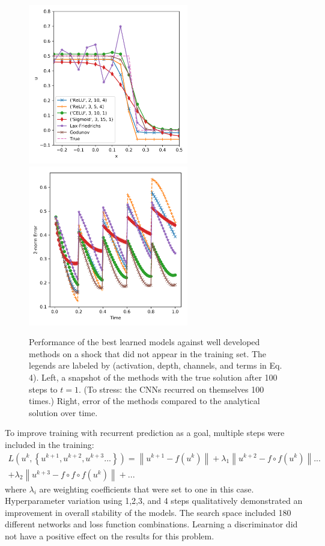 \documentclass{article}
\begin{document}
\begin{figure}
  \centering
  \includegraphics[width=2.75in]{shockwave_profile.png}%
  \includegraphics[width=2.75in]{shockwave_error.png}
  \caption{\label{fig:shock_comparison}Performance of the best learned models against well
    developed methods on a shock that did not appear in the
    training set. The legends are labeled by (activation, depth,
    channels, and terms in Eq. 4). Left, a snapshot of the methods with the true
    solution after 100 steps to $t=1$. (To stress: the CNNs recurred on
    themselves 100 times.) Right, error of the
    methods compared to the analytical solution over time. }
\end{figure}

To improve training with recurrent prediction as a goal,
multiple steps were included in the training:
\begin{eqnarray}
L\left(u^k,\left\{u^{k+1},u^{k+2},u^{k+3}...\right\}\right) =  \left\|
  u^{k+1}-f(u^k) \right\| + \lambda_1  \left\| u^{k+2}-f \circ f(u^k)
  \right\| ...\nonumber
  \\
   + \lambda_2  \left\| u^{k+3}-f \circ f \circ f(u^k) \right\| + ...
\end{eqnarray}
where $\lambda_i$ are weighting coefficients that were set to one in
this case. Hyperparameter variation using 1,2,3, and 4 steps
qualitatively demonstrated an
improvement in overall stability of the models. The search space included 180 different networks and loss
function combinations. Learning a discriminator did not have a positive effect on the
results for this problem.
\end{document}
